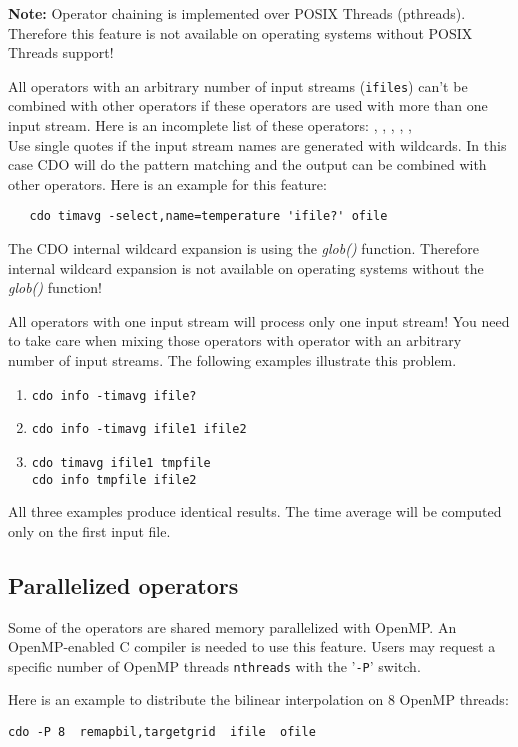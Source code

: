 {\bf Note:}
Operator chaining is implemented over POSIX Threads (pthreads).
Therefore this {\CDO} feature is not available on operating systems without POSIX Threads support!

All operators with an arbitrary number of input streams ({\tt ifiles})
can't be combined with other operators if these operators are used
with more than one input stream. Here is an incomplete list of
these operators:
{\bf {}},
{\bf {}},
{\bf {}},
{\bf {}},
{\bf {}},
{\bf {}} \\
Use single quotes if the input stream names are generated with
wildcards. In this case CDO will do the pattern matching and the
output can be combined with other operators. Here is an example for
this feature:
\begin{verbatim}
   cdo timavg -select,name=temperature 'ifile?' ofile
\end{verbatim}

The CDO internal wildcard expansion is using the {\it glob()} function. 
Therefore internal wildcard expansion is not available on operating systems without the {\it glob()} function!

All operators with one input stream will process only one input
stream! You need to take care when mixing those operators with
operator with an arbitrary number of input streams. 
The following examples illustrate this problem.
\begin{enumerate}
\item {\tt cdo info -timavg ifile?}
\item {\tt cdo info -timavg ifile1 ifile2}
\item {\tt cdo timavg ifile1 tmpfile} \\
{\tt cdo info tmpfile ifile2}
\end{enumerate}
 All three examples produce identical results. 
The time average will be computed only on the first input file. 
\subsection{Parallelized operators}

Some of the {\CDO} operators are shared memory parallelized with OpenMP.
An OpenMP-enabled C compiler is needed to use this feature.
Users may request a specific number of OpenMP threads {\tt nthreads} with the '{\tt -P}' switch.

Here is an example to distribute the bilinear interpolation on 8 OpenMP threads:
\begin{lstlisting}[frame=single, backgroundcolor=\color{pcolor2}, basicstyle=\ttfamily, columns=flexible]
   cdo -P 8  remapbil,targetgrid  ifile  ofile
\end{lstlisting}


